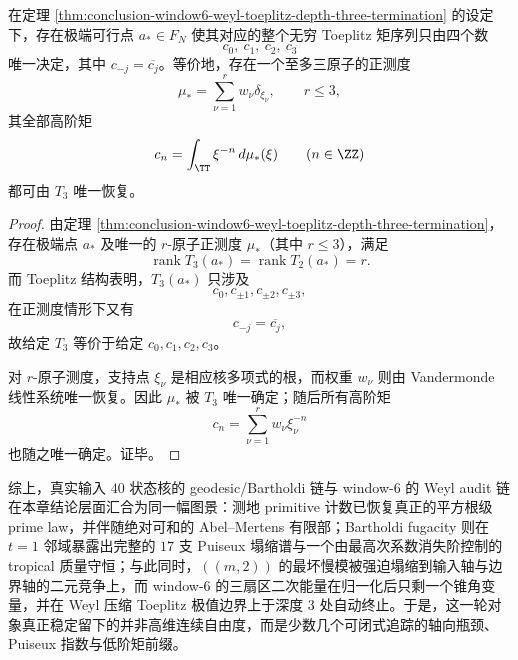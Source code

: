 \begin{corollary}[极值视界链的三阶矩充分性]\label{cor:conclusion-window6-weyl-toeplitz-third-moment-sufficiency}
在定理 \ref{thm:conclusion-window6-weyl-toeplitz-depth-three-termination} 的设定下，存在极端可行点 \(a_\ast\in F_N\) 使其对应的整个无穷 Toeplitz 矩序列只由四个数
\[
c_0,\ c_1,\ c_2,\ c_3
\]
唯一决定，其中 \(c_{-j}=\overline{c_j}\)。等价地，存在一个至多三原子的正测度
\[
\mu_\ast=\sum_{\nu=1}^r w_\nu\delta_{\xi_\nu},
\qquad r\le 3,
\]
其全部高阶矩
\[
c_n=\int_{\TT}\xi^{-n}\,d\mu_\ast(\xi)
\qquad (n\in \ZZ)
\]
都可由 \(T_3\) 唯一恢复。
\end{corollary}
\begin{proof}
由定理 \ref{thm:conclusion-window6-weyl-toeplitz-depth-three-termination}，存在极端点 \(a_\ast\) 及唯一的 \(r\)-原子正测度 \(\mu_\ast\)（其中 \(r\le 3\)），满足
\[
\operatorname{rank}T_3(a_\ast)=\operatorname{rank}T_2(a_\ast)=r.
\]
而 Toeplitz 结构表明，\(T_3(a_\ast)\) 只涉及
\[
c_0,c_{\pm1},c_{\pm2},c_{\pm3},
\]
在正测度情形下又有
\[
c_{-j}=\overline{c_j},
\]
故给定 \(T_3\) 等价于给定 \(c_0,c_1,c_2,c_3\)。

对 \(r\)-原子测度，支持点 \(\xi_\nu\) 是相应核多项式的根，而权重 \(w_\nu\) 则由 Vandermonde 线性系统唯一恢复。因此 \(\mu_\ast\) 被 \(T_3\) 唯一确定；随后所有高阶矩
\[
c_n=\sum_{\nu=1}^r w_\nu\xi_\nu^{-n}
\]
也随之唯一确定。证毕。
\end{proof}

\noindent
综上，真实输入 \(40\) 状态核的 geodesic/Bartholdi 链与 window-\(6\) 的 Weyl audit 链在本章结论层面汇合为同一幅图景：测地 primitive 计数已恢复真正的平方根级 prime law，并伴随绝对可和的 Abel--Mertens 有限部；Bartholdi fugacity 则在 \(t=1\) 邻域暴露出完整的 \(17\) 支 Puiseux 塌缩谱与一个由最高次系数消失阶控制的 tropical 质量守恒；与此同时，\(((m,2))\) 的最坏慢模被强迫塌缩到输入轴与边界轴的二元竞争上，而 window-\(6\) 的三扇区二次能量在归一化后只剩一个锥角变量，并在 Weyl 压缩 Toeplitz 极值边界上于深度 \(3\) 处自动终止。于是，这一轮对象真正稳定留下的并非高维连续自由度，而是少数几个可闭式追踪的轴向瓶颈、Puiseux 指数与低阶矩前缀。

\endinput
